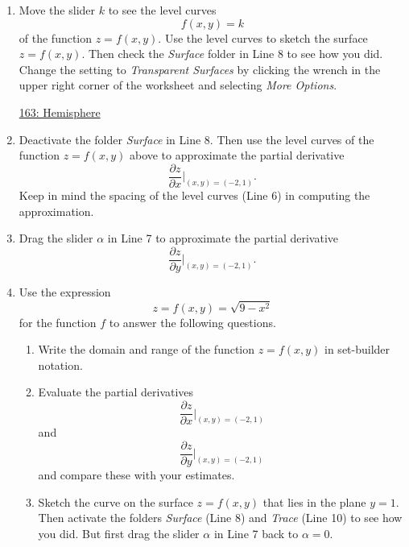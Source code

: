 \documentclass{ximera}
\begin{document}
\begin{example}  \label{Edfhf45}
\begin{enumerate}
\item Move the slider $k$ to see the level curves 
\[
    f(x,y)=k
\]
of the function $z=f(x,y)$. Use the level curves to sketch the surface $z=f(x,y)$. Then check the \emph{Surface} folder in Line 8 to see how you did. Change the setting to \emph{Transparent Surfaces} by clicking the wrench in the upper right corner of the worksheet and selecting \emph{More Options}.


 
\begin{onlineOnly}
    \begin{center}
\end{center}
\end{onlineOnly}

\href{https://www.desmos.com/3d/u5syjyxcsw}{163: Hemisphere}

\item Deactivate the folder \emph{Surface} in Line 8. Then use the level curves of the function $z = f(x,y)$ above to approximate the partial derivative
\[
    \frac{\partial z}{\partial x} \Big|_{(x,y)= (-2,1)} .
\]
Keep in mind the spacing of the level curves (Line 6) in computing the approximation.

\item Drag the slider $\alpha$ in Line 7 to approximate the partial derivative
\[
    \frac{\partial z}{\partial y} \Big|_{(x,y)= (-2,1)} .
\]

\item Use the expression
\[
  z = f(x,y) = \sqrt{9-x^2}
\]
for the function $f$ to answer the following questions.

\begin{enumerate}
\item Write the domain and range of the function $z=f(x,y)$ in set-builder notation.

\item Evaluate the partial derivatives 
\[
    \frac{\partial z}{\partial x} \Big|_{(x,y)= (-2,1)} 
\]
and
\[
    \frac{\partial z}{\partial y} \Big|_{(x,y)= (-2,1)} 
\]
and compare these with your estimates.

\item Sketch the curve on the surface $z=f(x,y)$ that lies in the plane $y=1$. Then activate the folders \emph{Surface} (Line 8) and \emph{Trace} (Line 10) to see how you did. But first drag the slider $\alpha$ in Line 7 back to $\alpha = 0$.


\end{enumerate}
\end{enumerate}
\end{example}
\end{document}
